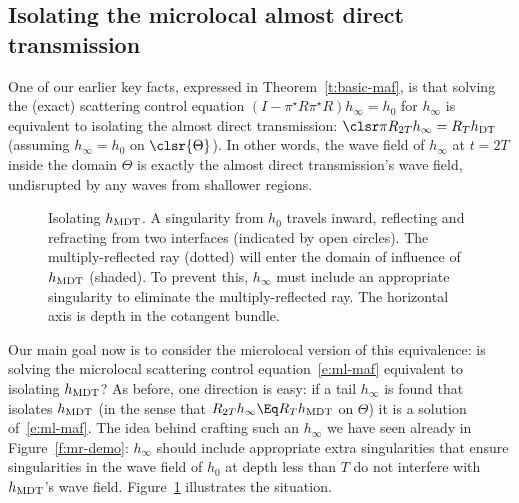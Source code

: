 \documentclass[10pt]{article}
\theoremstyle{plain}
\theoremstyle{definition}
\theoremstyle{remark}
\numberwithin{theorem}{section}
\numberwithin{example}{section}
\numberwithin{equation}{section}
\numberwithin{figure}{section}
\newcommand\DT{\ensuremath{_{\text{\normalfont DT}}}}		%
\newcommand\MDT{\ensuremath{_{\text{\normalfont MDT}}}}	%
\newcommand\eqml{\Eq}					%
\begin{document}
\subsection{Isolating the microlocal almost direct transmission}			\label{s:ml-isolating}

One of our earlier key facts, expressed in Theorem~\ref{t:basic-maf}, is that solving the (exact) scattering control equation $(I-\pi^\star R\pi^\star R)h_\infty=h_0$ for $h_\infty$ is equivalent to isolating the almost direct transmission: $\clsr\pi R_{2T}h_\infty=R_Th\DT$ (assuming $h_\infty=h_0$ on $\clsr{\Theta}$). In other words, the wave field of $h_\infty$ at $t=2T$ inside the domain $\Theta$ is exactly the almost direct transmission's wave field, undisrupted by any waves from shallower regions.

\begin{figure}
	\centering
	\mbox{}
	\hfill
	\hfill\hfill
	\hfill\hfill
	\mbox{}
		
	\caption{Isolating $h\MDT$. A singularity from $h_0$ travels inward, reflecting and refracting from two interfaces (indicated by open circles). The multiply-reflected ray (dotted) will enter the domain of influence of $h\MDT$ (shaded). To prevent this, $h_\infty$ must include an appropriate singularity to eliminate the multiply-reflected ray. The horizontal axis is depth in the cotangent bundle.
	}
	\label{f:isolate-mdt}
\end{figure}

Our main goal now is to consider the microlocal version of this equivalence: is solving the microlocal scattering control equation~\eqref{e:ml-maf} equivalent to isolating $h\MDT$? As before, one direction is easy: if a tail $h_\infty$ is found that isolates $h\MDT$ (in the sense that $R_{2T}h_\infty\eqml R_Th\MDT$ on $\Theta$) it is a solution of~\eqref{e:ml-maf}. The idea behind crafting such an $h_\infty$ we have seen already in Figure~\ref{f:mr-demo}: $h_\infty$ should include appropriate extra singularities that ensure singularities in the wave field of $h_0$ at depth less than $T$ do not interfere with $h\MDT$'s wave field. Figure~\ref{f:isolate-mdt} illustrates the situation.
\end{document}
